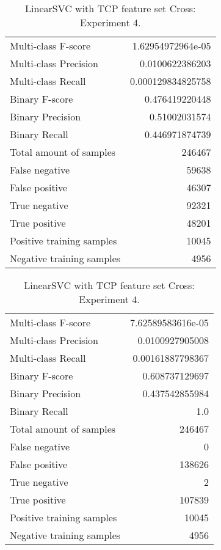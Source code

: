 \begin{table}[H]
\begin{minipage}{0.5\textwidth}
\caption{LinearSVC with TCP feature set Cross: Experiment 3.}
\centering
\begin{tabular}{l r}
\toprule
Multi-class F-score & 1.62954972964e-05 \\
Multi-class Precision & 0.0100622386203 \\
Multi-class Recall & 0.000129834825758 \\
\midrule
Binary F-score & 0.476419220448 \\
Binary Precision & 0.51002031574 \\
Binary Recall & 0.446971874739 \\
\midrule
Total amount of samples & 246467 \\
False negative & 59638 \\
False positive & 46307 \\
True negative & 92321 \\
True positive & 48201 \\
\midrule
Positive training samples & 10045 \\
Negative training samples & 4956 \\
\bottomrule
\end{tabular}
\end{minipage}
\hfillx
\begin{minipage}{0.5\textwidth}
\caption{LinearSVC with TCP feature set Cross: Experiment 4.}
\centering
\begin{tabular}{l r}
\toprule
Multi-class F-score & 7.62589583616e-05 \\
Multi-class Precision & 0.0100927905008 \\
Multi-class Recall & 0.00161887798367 \\
\midrule
Binary F-score & 0.608737129697 \\
Binary Precision & 0.437542855984 \\
Binary Recall & 1.0 \\
\midrule
Total amount of samples & 246467 \\
False negative & 0 \\
False positive & 138626 \\
True negative & 2 \\
True positive & 107839 \\
\midrule
Positive training samples & 10045 \\
Negative training samples & 4956 \\
\bottomrule
\end{tabular}
\end{minipage}
\end{table}
